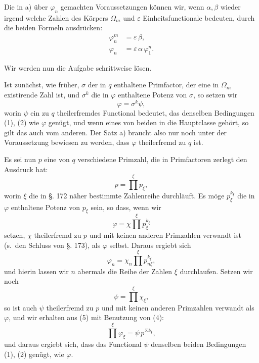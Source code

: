 \documentclass[12pt,a4paper]{article}
\begin{document}
Die in a) über $\varphi_n$ gemachten Voraussetzungen können wir, wenn $\alpha, \beta$ wieder irgend welche Zahlen des Körpers $\Omega_m$ und $\varepsilon$ Einheitsfunctionale bedeuten, durch die beiden Formeln ausdrücken:
\begin{align}
\varphi_n^m &= \varepsilon\,\beta,\label{eq:182-1}\\
\varphi_n &= \varepsilon\,\alpha\,\varphi_1^n.\label{eq:182-2}
\end{align}

Wir werden nun die Aufgabe schrittweise lösen.

Ist zunächst, wie früher, $\sigma$ der in $q$ enthaltene Primfactor, der eine in $\Omega_m$ existirende Zahl ist, und $\sigma^k$ die in $\varphi$ enthaltene Potenz von $\sigma$, so setzen wir
\begin{equation}\label{eq:182-3}
\varphi = \sigma^k \psi,
\end{equation}
worin $\psi$ ein zu $q$ theilerfremdes Functional bedeutet, das denselben Bedingungen (1), (2) wie $\varphi$ genügt, und wenn eines von beiden in die Hauptclasse gehört, so gilt das auch vom anderen. Der Satz a) braucht also nur noch unter der Voraussetzung bewiesen zu werden, dass $\varphi$ theilerfremd zu $q$ ist.

Es sei nun $p$ eine von $q$ verschiedene Primzahl, die in Primfactoren zerlegt den Ausdruck hat:
\begin{equation}\label{eq:182-4}
p = \prod^\xi p_\xi,
\end{equation}
worin $\xi$ die in \S. 172 näher bestimmte Zahlenreihe durchläuft. Es möge $p_\xi^{k_\xi}$ die in $\varphi$ enthaltene Potenz von $p_\xi$ sein, so dass, wenn wir
\[
\varphi = \chi \prod^\xi p_\xi^{k_\xi}
\]
setzen, $\chi$ theilerfremd zu $p$ und mit keinen anderen Primzahlen verwandt ist (s.\ den Schluss von \S. 173), als $\varphi$ selbst. Daraus ergiebt sich
\begin{equation}\label{eq:182-5}
\varphi_n = \chi_n \prod^\xi p_{n\xi}^{k_\xi},
\end{equation}
und hierin lassen wir $n$ abermals die Reihe der Zahlen $\xi$ durchlaufen. Setzen wir noch
\[
\psi = \prod^\xi \chi_\xi,
\]
so ist auch $\psi$ theilerfremd zu $p$ und mit keinen anderen Primzahlen verwandt als $\varphi$, und wir erhalten aus (5) mit Benutzung von (4):
\begin{equation}\label{eq:182-6}
\prod^\xi \varphi_\xi = \psi\,p^{\Sigma k_\xi},
\end{equation}
und daraus ergiebt sich, dass das Functional $\psi$ denselben beiden Bedingungen (1), (2) genügt, wie $\varphi$.
\end{document}
